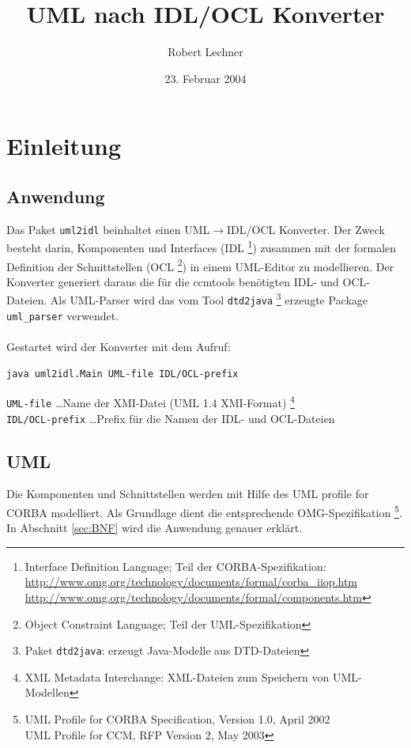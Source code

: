 \documentclass [a4paper,10pt] {scrartcl}
\author{Robert Lechner}
\title{UML nach IDL/OCL Konverter}
\date{23. Februar 2004}
\begin{document}
\maketitle
\tableofcontents
\cleardoublepage

\section{Einleitung}
\subsection{Anwendung}
Das Paket \texttt{uml2idl} beinhaltet einen \textsf{UML}$\rightarrow$\textsf{IDL/OCL}
Konverter. Der Zweck besteht darin, Komponenten und Interfaces (\textsf{IDL}
\footnote{Interface Definition Language; Teil der CORBA-Spezifikation:\\
\url{http://www.omg.org/technology/documents/formal/corba_iiop.htm}\\
\url{http://www.omg.org/technology/documents/formal/components.htm}
}) zusammen mit der
formalen Definition der Schnittstellen (\textsf{OCL}
\footnote{Object Constraint Language; Teil der UML-Spezifikation}) in einem \textsf{UML}-Editor
zu modellieren. Der Konverter generiert daraus die f{\"u}r die \textsf{ccmtools} ben{\"o}tigten
\textsf{IDL}- und \textsf{OCL}-Dateien.
Als \textsf{UML}-Parser wird das vom Tool \texttt{dtd2java}
\footnote{Paket \texttt{dtd2java}: erzeugt Java-Modelle aus DTD-Dateien}
erzeugte Package \texttt{uml\_parser} verwendet. \\
~\\
Gestartet wird der Konverter mit dem Aufruf:
\begin{verbatim}
java uml2idl.Main UML-file IDL/OCL-prefix
\end{verbatim}
\texttt{UML-file} \dots Name der \textsf{XMI}-Datei (UML 1.4 XMI-Format)
\footnote{XML Metadata Interchange: XML-Dateien zum Speichern von UML-Modellen}\\
\texttt{IDL/OCL-prefix} \dots Prefix f{\"u}r die Namen der \textsf{IDL}- und \textsf{OCL}-Dateien
\subsection{UML}
Die Komponenten und Schnittstellen werden mit Hilfe des \textsf{UML profile for CORBA}
modelliert. Als Grundlage dient die entsprechende \textsf{OMG}-Spezifikation
\footnote{UML Profile for CORBA Specification, Version 1.0, April 2002\\
UML Profile for CCM, RFP Version 2, May 2003}.\\
In Abschnitt \ref{sec:BNF} wird die Anwendung genauer erkl{\"a}rt.
\end{document}
